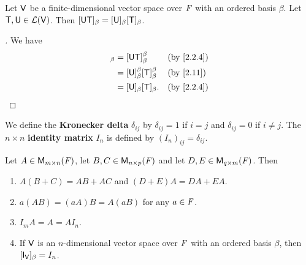 \begin{cor}\label{2.3.3}
	Let \(\mathsf{V}\) be a finite-dimensional vector space over \(\mathit{F}\) with an ordered basis \(\beta\).
	Let \(\mathsf{T}, \mathsf{U} \in \mathcal{L}(\mathsf{V})\).
	Then \([\mathsf{U} \mathsf{T}]_{\beta} = [\mathsf{U}]_{\beta} [\mathsf{T}]_{\beta}\).
\end{cor}

\begin{proof}[]
	We have
	\begin{align*}
		[\U \T]_{\beta} & = [\U \T]_{\beta}^{\beta}                   &  & \by{2.2.4} \\
		                & = [\U]_{\beta}^{\beta} [\T]_{\beta}^{\beta} &  & \by{2.11}  \\
		                & = [\U]_{\beta} [\T]_{\beta}.                &  & \by{2.2.4}
	\end{align*}
\end{proof}

\begin{defn}\label{2.3.4}
	We define the \textbf{Kronecker delta} \(\delta_{i j}\) by \(\delta_{i j} = 1\) if \(i = j\) and \(\delta_{i j} = 0\) if \(i \neq j\).
	The \(n \times n\) \textbf{identity matrix} \(I_n\) is defined by \((I_n)_{i j} = \delta_{i j}\).
\end{defn}

\begin{thm}\label{2.12}
	Let \(A \in \MS\), let \(B, C \in \ms[n][p][\F]\) and let \(D, E \in \ms[q][m][\F]\).
	Then
	\begin{enumerate}
		\item \(A (B + C) = AB + AC\) and \((D + E) A = DA + EA\).
		\item \(a (AB) = (aA) B = A (aB)\) for any \(a \in \mathit{F}\).
		\item \(I_m A = A = A I_n\).
		\item If \(\mathsf{V}\) is an \(n\)-dimensional vector space over \(\mathit{F}\) with an ordered basis \(\beta\), then \([\IT[\V]]_{\beta} = I_n\).
	\end{enumerate}
\end{thm}

